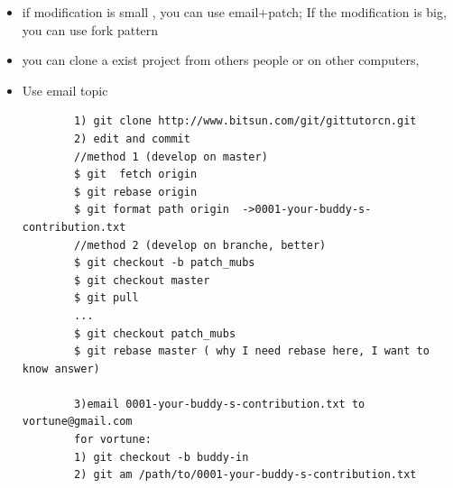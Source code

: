 \documentclass[a4paper,12pt,twoside]{book}
\begin{document}
%
%
%
%
	\begin{itemize}
	\item if modification is small , you can use email+patch; If the modification is big, you can use fork pattern

    \item you can clone a exist project from others people or on other computers,
	\item Use email topic
		\begin{verbatim}
		1) git clone http://www.bitsun.com/git/gittutorcn.git
		2) edit and commit
		//method 1 (develop on master)
		$ git  fetch origin
		$ git rebase origin
		$ git format path origin  ->0001-your-buddy-s-contribution.txt
		//method 2 (develop on branche, better)
		$ git checkout -b patch_mubs
		$ git checkout master
		$ git pull
		...
		$ git checkout patch_mubs
		$ git rebase master ( why I need rebase here, I want to know answer)
		
		3)email 0001-your-buddy-s-contribution.txt to vortune@gmail.com
		for vortune:
		1) git checkout -b buddy-in
		2) git am /path/to/0001-your-buddy-s-contribution.txt
		
		\end{verbatim}
	\end{itemize}
\end{document}
